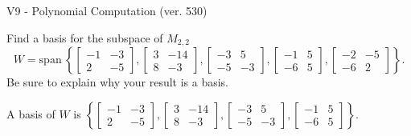 \begin{exercise}
  \begin{exerciseTitle}V9 - Polynomial Computation (ver. 530)\end{exerciseTitle}
  \begin{exerciseStatement}
    Find a basis for the subspace of \(M_{2,2}\) 
\[W=\mathrm{span}\ \left\{\left[\begin{array}{cc}
-1 & -3 \\
2 & -5
\end{array}\right] , \left[\begin{array}{cc}
3 & -14 \\
8 & -3
\end{array}\right] , \left[\begin{array}{cc}
-3 & 5 \\
-5 & -3
\end{array}\right] , \left[\begin{array}{cc}
-1 & 5 \\
-6 & 5
\end{array}\right] , \left[\begin{array}{cc}
-2 & -5 \\
-6 & 2
\end{array}\right]\right\}.\]
 Be sure to explain why your result is a basis.


  \end{exerciseStatement}
  \begin{exerciseAnswer}
   A basis of \(W\) is  \(\left\{\left[\begin{array}{cc}
-1 & -3 \\
2 & -5
\end{array}\right] , \left[\begin{array}{cc}
3 & -14 \\
8 & -3
\end{array}\right] , \left[\begin{array}{cc}
-3 & 5 \\
-5 & -3
\end{array}\right] , \left[\begin{array}{cc}
-1 & 5 \\
-6 & 5
\end{array}\right]\right\}\).
  


  \end{exerciseAnswer}
\end{exercise}